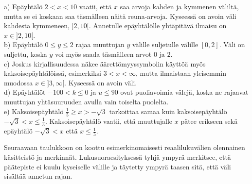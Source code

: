 \begin{esimerkki}

a) Epäyhtälö $2<x<10$ vaatii, että $x$ saa arvoja kahden ja kymmenen väliltä, mutta se ei koskaan saa täsmälleen näitä reuna-arvoja. Kyseessä on avoin väli kahdesta kymmeneen, $]2,10[$. Annetulle epäyhtälölle yhtäpitävä ilmaisu on $x \in ]2,10[$. \\
b) Epäyhtälö $0\leq y \leq 2$ rajaa muuttujan $y$ välille suljetulle välille $[0,2]$. Väli on suljettu, koska $y$ voi myös saada täsmälleen arvot $0$ ja $2$. \\
c) Joskus kirjallisuudessa näkee äärettömyyssymbolin käyttöä myös kaksoisepäyhtälöissä, esimerkiksi $3<x<\infty $, mutta ilmaistaan yleisemmin muodossa $x \in ]3,\infty[$. Kyseessä on avoin väli. \\
d) Epäyhtälöt $-100<k\leq 0$ ja $u\leq 90$ ovat puoliavoimia välejä, koska ne rajaavat muuttujan yhtäsuuruuden avulla vain toiselta puolelta. \\
e) Kaksoisepäyhtälö $\frac{1}{5}\geq x>-\sqrt{3}$ tarkoittaa samaa kuin kaksoisepäyhtälö $-\sqrt{3}<x\leq \frac{1}{5}$. Kaksoisepäyhtälö vaatii, että muuttujalle $x$ pätee erikseen sekä epäyhtälö $-\sqrt{3}<x$ että $x\leq \frac{1}{5}$.
\end{esimerkki}

Seuraavaan taulukkoon on koottu esimerkinomaisesti reaalilukuvälien olennainen käsitteistö ja merkinnät. Lukusuoraesityksessä tyhjä ympyrä merkitsee, että päätepiste ei kuulu kyseiselle välille ja täytetty ympyrä taasen sitä, että väli sisältää annetun rajan.

